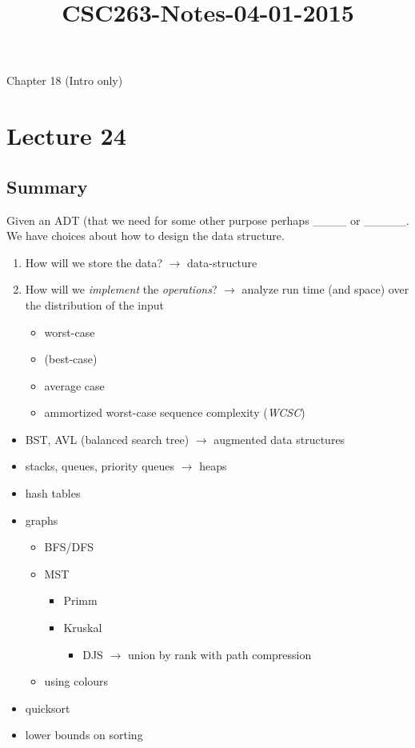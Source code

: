 



\title{CSC263-Notes-04-01-2015}



\reversemarginpar

\mpreadings

\noindent Chapter 18 (Intro only)

\section*{Lecture 24}

\subsection*{Summary}

\noindent Given an ADT (that we need for some other purpose perhaps \_\_\_\_ or
\_\_\_\_\_. We have choices about how to design the data structure. \\

\begin{enumerate}
	\item How will we store the data? $\rightarrow$ data-structure
	\item How will we \textit{implement} the \textit{operations}? $\rightarrow$
	analyze run time (and space) over the distribution of the input
		\begin{itemize}
			\item worst-case
			\item (best-case)
			\item average case
			\item ammortized worst-case sequence complexity (\textit{WCSC}) 
		\end{itemize}
\end{enumerate}

\begin{itemize}
	\item BST, AVL (balanced search tree) $\rightarrow$ augmented data structures
	\item stacks, queues, priority queues $\rightarrow$ heaps
	\item hash tables
	\item graphs
		\begin{itemize}
			\item BFS/DFS
			\item MST
				\begin{itemize}
					\item Primm
					\item Kruskal
						\begin{itemize}
							\item DJS $\rightarrow$ union by rank with path
							compression
						\end{itemize}
				\end{itemize}
			\item using colours
		\end{itemize}
	\item quicksort
	\item lower bounds on sorting
\end{itemize}

